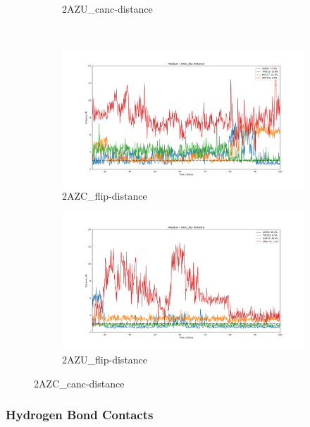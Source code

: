 \documentclass[fleqn,10pt]{wlscirep}
\begin{document}
\begin{figure}[!ht]
\begin{subfigure}{.45\textwidth}
     \caption{2AZU_{canc}-distance}
     \label{fig:2AZU_canc-dist}
   \end{subfigure}
   \\
   \begin{subfigure}{.45\textwidth}
     \centering
     \includegraphics[width=.95\linewidth]{2AZC_flip/2AZC_flip-dist_3.png}
     \caption{2AZC_{flip}-distance}
     \label{fig:2AZC_flip-dist}
   \end{subfigure}
    \begin{subfigure}{.45\textwidth}
     \centering
     \includegraphics[width=.95\linewidth]{2AZU_flip/2AZU_flip-dist_4.png}
     \caption{2AZU_{flip}-distance}
     \label{fig:2AZU_flip-dist}
   \end{subfigure}
\caption{2AZC_{canc}-distance}
\label{fig:contact-distance}
\end{figure}  

\subsubsection{Hydrogen Bond Contacts}
\end{document}
